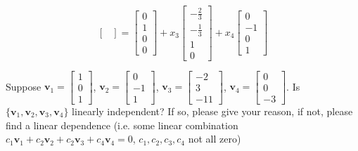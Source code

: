 \documentclass[a4paper,10pt]{article}
\begin{document}
\begin{solution}
\[\begin{bmatrix}
\end{bmatrix}=\begin{bmatrix}
0\\1\\0\\0
\end{bmatrix}+x_3\begin{bmatrix}
-\frac{2}{3}\\-\frac{1}{3}\\1\\0
\end{bmatrix}+x_4\begin{bmatrix}
0\\-1\\0\\1
\end{bmatrix}
\]
\end{solution}

\begin{problem}
Suppose $\mathbf v_1=\begin{bmatrix}
1\\0\\1
\end{bmatrix}$, $\mathbf v_2=\begin{bmatrix}
0\\-1\\1
\end{bmatrix}$, $\mathbf v_3=\begin{bmatrix}
-2\\3\\-11
\end{bmatrix}$, $\mathbf v_4=\begin{bmatrix}
0\\0\\-3
\end{bmatrix}$. Is $\{\mathbf v_1,\mathbf v_2,\mathbf v_3,\mathbf v_4\}$ linearly independent? If so, please give your reason, if not, please find a linear dependence (i.e. some linear combination $c_1\mathbf v_1+c_2\mathbf v_2+c_2\mathbf v_3+c_4\mathbf v_4=0$, $c_1,c_2,c_3,c_4$ not all zero)
\end{problem}
\end{document}
